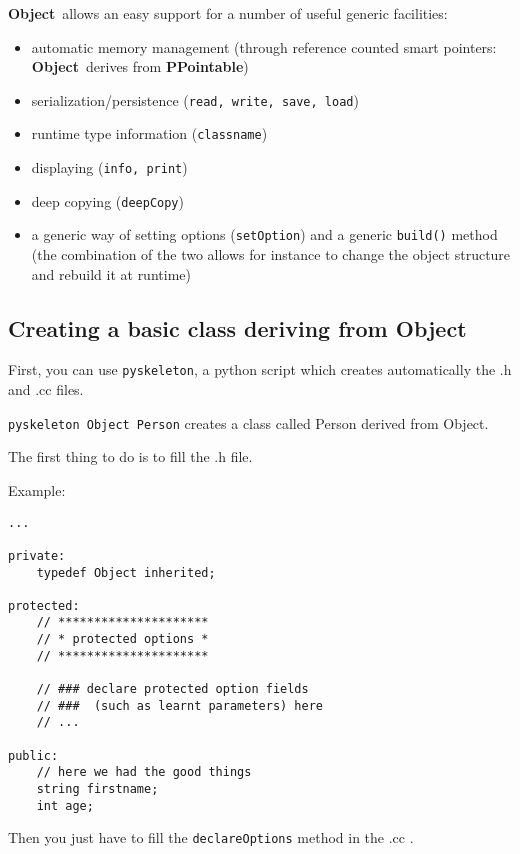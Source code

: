 \documentclass[11pt]{book}
\newcommand{\Object}{{\bf Object}}
\newcommand{\PPointable}{{\bf PPointable}}
\begin{document}
\Object\ allows an easy support for a number of useful generic facilities:
\begin{itemize}
\item automatic memory management (through reference counted smart pointers: \Object\ derives from \PPointable)
\item serialization/persistence ({\tt read, write, save, load})
\item runtime type information ({\tt classname})
\item displaying ({\tt info, print})
\item deep copying ({\tt deepCopy})
\item a generic way of setting options ({\tt setOption}) and a generic
  {\tt build()} method (the combination of the two allows for instance
  to change the object structure and rebuild it at runtime)
\end{itemize}


\subsection{Creating a basic class deriving from Object}

First, you can use \texttt{pyskeleton}, a python script which creates
automatically the .h and .cc files.

\texttt{pyskeleton Object Person} creates a class called Person derived from Object.

The first thing to do is to fill the .h file.

Example:

\begin{verbatim}
...

private:
    typedef Object inherited;

protected:
    // *********************
    // * protected options *
    // *********************

    // ### declare protected option fields 
    // ###  (such as learnt parameters) here
    // ...

public:
    // here we had the good things
    string firstname;
    int age;

\end{verbatim}

Then you just have to fill the \texttt{declareOptions} method in the .cc .
\end{document}
